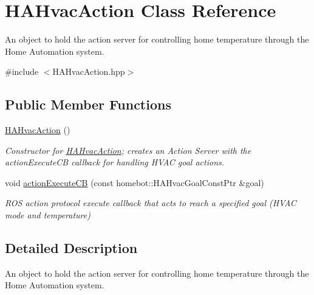 \hypertarget{classHAHvacAction}{\section{H\-A\-Hvac\-Action Class Reference}
\label{classHAHvacAction}
}


An object to hold the action server for controlling home temperature through the Home Automation system.  




{\ttfamily \#include $<$H\-A\-Hvac\-Action.\-hpp$>$}

\subsection*{Public Member Functions}
\begin{DoxyCompactItemize}
\item 
\hypertarget{classHAHvacAction_afb96baf5e6786f0a908a125e87d143de}{\hyperlink{classHAHvacAction_afb96baf5e6786f0a908a125e87d143de}{H\-A\-Hvac\-Action} ()}\label{classHAHvacAction_afb96baf5e6786f0a908a125e87d143de}

\begin{DoxyCompactList}\small\item\em Constructor for \hyperlink{classHAHvacAction}{H\-A\-Hvac\-Action}; creates an Action Server with the action\-Execute\-C\-B callback for handling H\-V\-A\-C goal actions. \end{DoxyCompactList}\item 
void \hyperlink{classHAHvacAction_a3e33b4768e1b3105cab0449bdcad2980}{action\-Execute\-C\-B} (const homebot\-::\-H\-A\-Hvac\-Goal\-Const\-Ptr \&goal)
\begin{DoxyCompactList}\small\item\em R\-O\-S action protocol execute callback that acts to reach a specified goal (H\-V\-A\-C mode and temperature) \end{DoxyCompactList}\end{DoxyCompactItemize}


\subsection{Detailed Description}
An object to hold the action server for controlling home temperature through the Home Automation system. 

